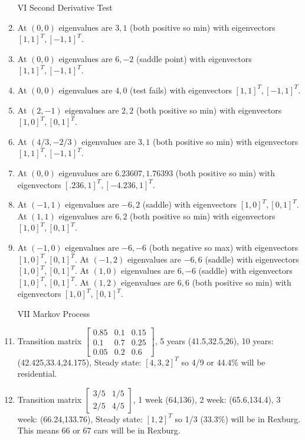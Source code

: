 \documentclass[10pt]{amsart}
\begin{document}
\begin{multicols}{2}
\begin{enumerate}
\item[VI] Second Derivative Test
\item At $(0,0)$ eigenvalues are $3,1$ (both positive so min) with eigenvectors $[1,1]^T,[-1,1]^T$.
\item At $(0,0)$ eigenvalues are $6,-2$ (saddle point) with eigenvectors $[1,1]^T,[-1,1]^T$.
\item At $(0,0)$ eigenvalues are $4,0$ (test fails) with eigenvectors $[1,1]^T,[-1,1]^T$.
\item At $(2,-1)$ eigenvalues are $2,2$ (both positive so min) with eigenvectors $[1,0]^T,[0,1]^T$.
\item At $(4/3,-2/3)$ eigenvalues are $3,1$ (both positive so min) with eigenvectors $[1,1]^T,[-1,1]^T$.
\item At $(0,0)$ eigenvalues are $6.23607,1.76393$ (both positive so min) with eigenvectors $[.236,1]^T,[-4.236,1]^T$.
\item 
At $(-1,1)$ eigenvalues are $-6,2$ (saddle) with eigenvectors $[1,0]^T,[0,1]^T$.
At $(1,1)$ eigenvalues are $6,2$ (both positive so min) with eigenvectors $[1,0]^T,[0,1]^T$.
\item 
At $(-1,0)$ eigenvalues are $-6,-6$ (both negative so max) with eigenvectors $[1,0]^T,[0,1]^T$.
At $(-1,2)$ eigenvalues are $-6,6$ (saddle) with eigenvectors $[1,0]^T,[0,1]^T$.
At $(1,0)$ eigenvalues are $6,-6$ (saddle) with eigenvectors $[1,0]^T,[0,1]^T$.
At $(1,2)$ eigenvalues are $6,6$ (both positive so min) with eigenvectors $[1,0]^T,[0,1]^T$.







\item[VII] Markov Process

\item Transition matrix 
$\begin{bmatrix}
 0.85 & 0.1 & 0.15 \\
 0.1 & 0.7 & 0.25 \\
 0.05 & 0.2 & 0.6
\end{bmatrix}$,
5 years  (41.5,32.5,26), 
10 years: (42.425,33.4,24.175),
Steady state: $[4,3,2]^T$ so 4/9 or 44.4\% will be residential. 

\item
Transition matrix 
$\begin{bmatrix}
 {3}/{5} & {1}/{5} \\
 {2}/{5} & {4}/{5}
\end{bmatrix}$,
1 week  (64,136), 
2 week: (65.6,134.4),
3 week: (66.24,133.76),
Steady state: $[1,2]^T$ so 1/3 (33.3\%) will be in Rexburg. This means 66 or 67 cars will be in Rexburg. 
 

\end{enumerate}
\end{multicols}
\end{document}
